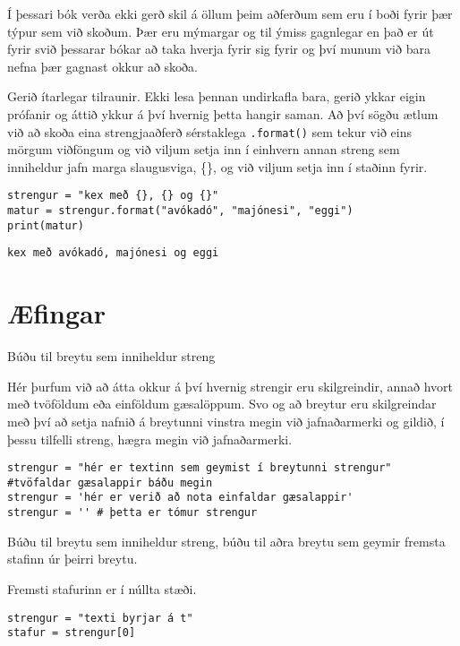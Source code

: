 Í þessari bók verða ekki gerð skil á öllum þeim aðferðum sem eru í boði fyrir þær týpur sem við skoðum.
Þær eru mýmargar og til ýmiss gagnlegar en það er út fyrir svið þessarar bókar að taka hverja fyrir sig fyrir og því munum við bara nefna þær gagnast okkur að skoða.

Gerið ítarlegar tilraunir.
Ekki lesa þennan undirkafla bara, gerið ykkar eigin prófanir og áttið ykkur á því hvernig þetta hangir saman.
Að því sögðu ætlum við að skoða eina strengjaaðferð sérstaklega \texttt{.format()} sem tekur við eins mörgum viðföngum og við viljum setja inn í einhvern annan streng sem inniheldur jafn marga slaugusviga, \{\}, og við viljum setja inn í staðinn fyrir.

\begin{lstlisting}[caption=Aðferðin .format() kynnt, label=lst:str-format]
strengur = "kex með {}, {} og {}"
matur = strengur.format("avókadó", "majónesi", "eggi")
print(matur)
\end{lstlisting}
\lstset{style=uttak}
\begin{lstlisting}
kex með avókadó, majónesi og eggi
\end{lstlisting}
\lstset{style=venjulegt}
\newpage
\section{Æfingar}
\begin{exercise}\label{str1}
	Búðu til breytu sem inniheldur streng
\end{exercise}
\begin{Answer}[ref={str1}]
	Hér þurfum við að átta okkur á því hvernig strengir eru skilgreindir, annað hvort með tvöföldum eða einföldum gæsalöppum.
	Svo og að breytur eru skilgreindar með því að setja nafnið á breytunni vinstra megin við jafnaðarmerki og gildið, í þessu tilfelli streng, hægra megin við jafnaðarmerki.
	\begin{lstlisting}
strengur = "hér er textinn sem geymist í breytunni strengur" #tvöfaldar gæsalappir báðu megin
strengur = 'hér er verið að nota einfaldar gæsalappir'
strengur = '' # þetta er tómur strengur\end{lstlisting}
\end{Answer}

\begin{exercise}\label{str2}
	Búðu til breytu sem inniheldur streng, búðu til aðra breytu sem geymir fremsta stafinn úr þeirri breytu.
\end{exercise}
\begin{Answer}[ref={str2}]
	Fremsti stafurinn er í núllta stæði.
	\begin{lstlisting}
strengur = "texti byrjar á t"
stafur = strengur[0]\end{lstlisting}
\end{Answer}

